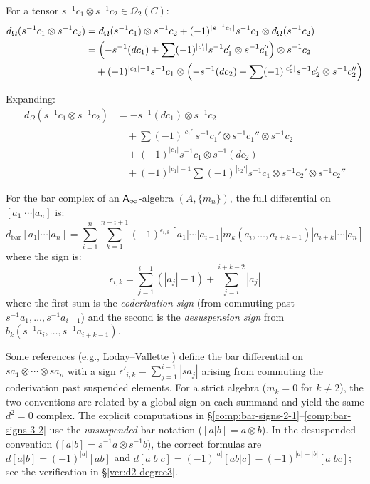 \begin{computation}
\label{comp:cobar-signs-2-3}
For a tensor $s^{-1}c_1 \otimes s^{-1}c_2 \in \Omega_2(C)$:
\begin{align*}
d_\Omega(s^{-1}c_1 \otimes s^{-1}c_2) &= d_\Omega(s^{-1}c_1) \otimes s^{-1}c_2 
    + (-1)^{|s^{-1}c_1|} s^{-1}c_1 \otimes d_\Omega(s^{-1}c_2) \\
&= \Bigl( -s^{-1}(dc_1) + \sum (-1)^{|c_1'|} s^{-1}c_1' \otimes s^{-1}c_1'' \Bigr) \otimes s^{-1}c_2 \\
&\quad + (-1)^{|c_1|-1} s^{-1}c_1 \otimes \Bigl( -s^{-1}(dc_2) + \sum (-1)^{|c_2'|} s^{-1}c_2' \otimes s^{-1}c_2'' \Bigr)
\end{align*}

Expanding:
\begin{align*}
d_\Omega(s^{-1}c_1 \otimes s^{-1}c_2) &= -s^{-1}(dc_1) \otimes s^{-1}c_2 \\
&\quad + \sum (-1)^{|c_1'|} s^{-1}c_1' \otimes s^{-1}c_1'' \otimes s^{-1}c_2 \\
&\quad + (-1)^{|c_1|} s^{-1}c_1 \otimes s^{-1}(dc_2) \\
&\quad + (-1)^{|c_1|-1} \sum (-1)^{|c_2'|} s^{-1}c_1 \otimes s^{-1}c_2' \otimes s^{-1}c_2''
\end{align*}
\end{computation}

\begin{proposition}
\label{prop:master-sign}
For the bar complex of an $\mathsf{A}_{\infty}$-algebra $(A, \{m_n\})$, the full differential 
on $[a_1|\cdots|a_n]$ is:
\[
d_{\mathrm{bar}}[a_1|\cdots|a_n] = \sum_{i=1}^{n} \sum_{k=1}^{n-i+1} 
(-1)^{\epsilon_{i,k}} [a_1|\cdots|a_{i-1}|m_k(a_i, \ldots, a_{i+k-1})|a_{i+k}|\cdots|a_n]
\]
where the sign is:
\[
\epsilon_{i,k} = \sum_{j=1}^{i-1} (|a_j| - 1) + \sum_{j=i}^{i+k-2} |a_j|
\]
where the first sum is the \emph{coderivation sign} (from commuting past
$s^{-1}a_1, \ldots, s^{-1}a_{i-1}$) and the second is the \emph{desuspension sign}
from $b_k(s^{-1}a_i, \ldots, s^{-1}a_{i+k-1})$.

\begin{remark}
Some references (e.g., Loday--Vallette \cite{LodayVallette}) define the bar differential
on $sa_1 \otimes \cdots \otimes sa_n$ with a sign
$\epsilon'_{i,k} = \sum_{j=1}^{i-1}|sa_j|$ arising from commuting the coderivation past
suspended elements.  For a strict algebra ($m_k = 0$ for $k \neq 2$), the two conventions
are related by a global sign on each summand and yield the same $d^2 = 0$ complex.
The explicit computations in \S\ref{comp:bar-signs-2-1}--\ref{comp:bar-signs-3-2}
use the \emph{unsuspended} bar notation ($[a|b] = a \otimes b$).  In the desuspended convention ($[a|b] = s^{-1}a \otimes s^{-1}b$), the correct formulas are
$d[a|b] = (-1)^{|a|}[ab]$ and $d[a|b|c] = (-1)^{|a|}[ab|c] - (-1)^{|a|+|b|}[a|bc]$; see the verification in \S\ref{ver:d2-degree3}.
\end{remark}
\end{proposition}


